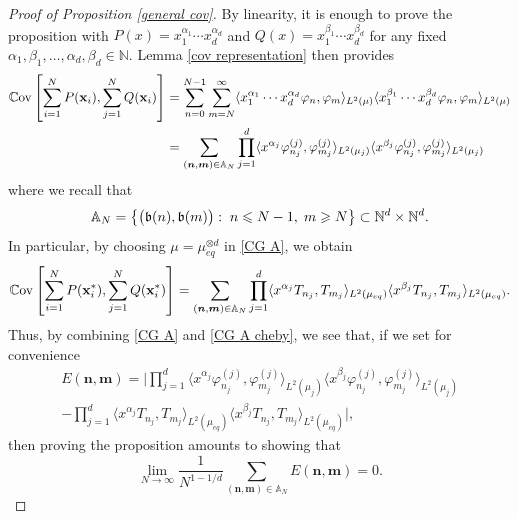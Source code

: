 \documentclass[a4paper,11pt]{article}
\numberwithin{equation}{section}
\theoremstyle{definition}
\newcommand{\eq}{\begin{equation}}
\newcommand{\qe}{\end{equation}}
\newcommand{\N}{\mathbb{N}}
\newcommand{\bs}{\boldsymbol}
\newcommand{\bv}{\mathbf}
\newcommand{\mueqd}{\mu_{eq}^{\otimes d}}
\renewcommand{\leq}{\leqslant}
\renewcommand{\geq}{\geqslant}
\renewcommand{\phi}{\varphi}
\begin{document}
\begin{proof}[Proof of Proposition \ref{general cov}]
By linearity, it is enough to prove the proposition with
$P(x)=x_1^{\alpha_1}\cdots x_d^{\alpha_d}$ and $Q(x)=x_1^{\beta_1}\cdots
x_d^{\beta_d}$ for any fixed $\alpha_1,\beta_1,\ldots,\alpha_d,\beta_d\in\N$.
Lemma \ref{cov representation} then provides
\begin{align}
\label{CG A}
 \mathbb C{\rm ov}\left[\sum_{i=1}^NP(\bv x_i),\sum_{j=1}^NQ(\bv x_i)\right] \nonumber
& = \sum_{n=0}^{N-1}\sum_{m=N}^\infty \langle x_1^{\alpha_1}\cdots x_d^{\alpha_d} \phi_n,\phi_m\rangle_{L^2(\mu)}\langle x_1^{\beta_1}\cdots x_d^{\beta_d}\phi_n,\phi_m\rangle_{L^2(\mu)}\nonumber\\
 & =  \sum_{(\bs n,\bs m)\in\mathbb A_N}\prod_{j=1}^d\langle x^{\alpha_j}\phi^{(j)}_{n_j},\phi^{(j)}_{m_j}\rangle_{L^2(\mu_j)}\langle x^{\beta_j}\phi^{(j)}_{n_j},\phi^{(j)}_{m_j}\rangle_{L^2(\mu_j)}
\end{align}
where we recall that
\[
\mathbb A_N=\big\{\big (\frak b(n),\frak b(m) \big):\; n\leq N-1,\; m\geq N\big\}\subset\N^d\times\N^d.
\]
In particular, by choosing $\mu=\mueqd$ in \eqref{CG A}, we obtain
\eq
\label{CG A cheby}
\mathbb C{\rm ov}\left[\sum_{i=1}^NP(\bv x_i^*),\sum_{j=1}^NQ(\bv x_i^*)\right]
= \sum_{(\bs n,\bs m)\in\mathbb A_N}
\prod_{j=1}^d\langle x^{\alpha_j}T_{n_j},T_{m_j}\rangle_{L^2(\mu_{eq})}\langle x^{\beta_j}T_{n_j},T_{m_j}\rangle_{L^2(\mu_{eq})}.
\qe
Thus, by combining \eqref{CG A} and \eqref{CG A cheby}, we see that, if we set for convenience
\begin{multline}
\label{Error ab}
E(\bs n,\bs m)=\Bigg| \prod_{j=1}^d\langle x^{\alpha_j}\phi^{(j)}_{n_j},\phi^{(j)}_{m_j}\rangle_{L^2(\mu_j)}\langle x^{\beta_j}\phi^{(j)}_{n_j},\phi^{(j)}_{m_j}\rangle_{L^2(\mu_j)}
\\
 -\prod_{j=1}^d\langle x^{\alpha_j}T_{n_j},T_{m_j}\rangle_{L^2(\mu_{eq})}\langle x^{\beta_j}T_{n_j},T_{m_j}\rangle_{L^2(\mu_{eq})}\Bigg|,
\end{multline}
then proving the proposition amounts to showing that
\eq
\label{todo cov approx}
\lim_{N\rightarrow\infty}\frac{1}{N^{1-1/d}}
\sum_{(\bs n,\bs m)\in\mathbb A_N}
E(\bs n,\bs m)=0.
\qe



\end{proof}
\end{document}
